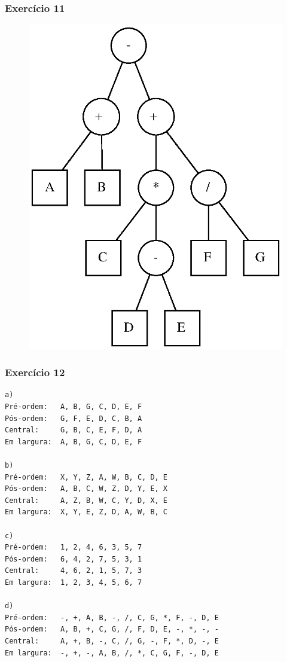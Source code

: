 \documentclass[aspectratio=169]{beamer}
\begin{document}
\begin{frame}[fragile]\frametitle{Exercício 11}
\begin{figure}[h]
	\centering
	\includegraphics[height=0.7\paperheight]{imagens/arvore_binaria10-expressao.eps}
\end{figure}
\end{frame}

\begin{frame}[fragile]\frametitle{Exercício 12}
{\tiny	
\begin{verbatim}
a)
Pré-ordem:   A, B, G, C, D, E, F
Pós-ordem:   G, F, E, D, C, B, A
Central:     G, B, C, E, F, D, A
Em largura:  A, B, G, C, D, E, F	

b)
Pré-ordem:   X, Y, Z, A, W, B, C, D, E
Pós-ordem:   A, B, C, W, Z, D, Y, E, X
Central:     A, Z, B, W, C, Y, D, X, E
Em largura:  X, Y, E, Z, D, A, W, B, C

c)
Pré-ordem:   1, 2, 4, 6, 3, 5, 7
Pós-ordem:   6, 4, 2, 7, 5, 3, 1
Central:     4, 6, 2, 1, 5, 7, 3
Em largura:  1, 2, 3, 4, 5, 6, 7

d)
Pré-ordem:   -, +, A, B, -, /, C, G, *, F, -, D, E
Pós-ordem:   A, B, +, C, G, /, F, D, E, -, *, -, -
Central:     A, +, B, -, C, /, G, -, F, *, D, -, E
Em largura:  -, +, -, A, B, /, *, C, G, F, -, D, E
\end{verbatim}
}
\end{frame}
\end{document}
